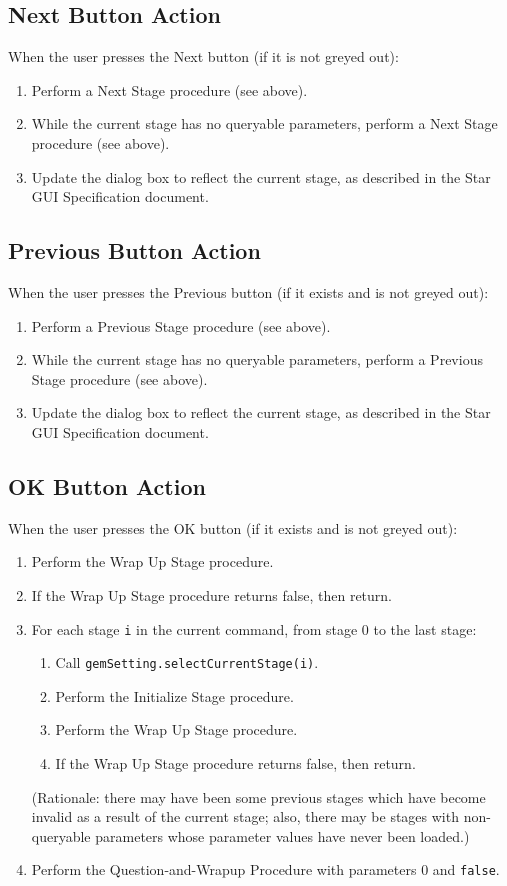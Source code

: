 \documentclass[11pt]{article}
\begin{document}
\subsection{Next Button Action}

When the user presses the Next button (if it is not greyed out):
\begin{enumerate}
\item Perform a Next Stage procedure (see above).
\item While the current stage has no queryable parameters, perform
  a Next Stage procedure (see above).
\item Update the dialog box to reflect the current stage, as described
  in the Star GUI Specification document.
\end{enumerate}

\subsection{Previous Button Action}

When the user presses the Previous button (if it exists and is not greyed
out):
\begin{enumerate}
\item Perform a Previous Stage procedure (see above).
\item While the current stage has no queryable parameters, perform
  a Previous Stage procedure (see above).
\item Update the dialog box to reflect the current stage, as described
  in the Star GUI Specification document.
\end{enumerate}

\subsection{OK Button Action}

When the user presses the OK button (if it exists and is not greyed
out):
\begin{enumerate}
\item Perform the Wrap Up Stage procedure.
\item If the Wrap Up Stage procedure returns false, then return.
\item For each stage \verb/i/ in the current command, from stage 0 to the
  last stage:
  \begin{enumerate}
  \item Call {\tt gemSetting.selectCurrentStage(i)}.
  \item Perform the Initialize Stage procedure.
  \item Perform the Wrap Up Stage procedure.
  \item If the Wrap Up Stage procedure returns false, then return.
  \end{enumerate}
  (Rationale:  there may have been some previous stages which have
  become invalid as a result of the current stage; also, there may be
  stages with non-queryable parameters whose parameter values have never
  been loaded.)
\item Perform the Question-and-Wrapup Procedure with parameters
  0 and {\tt false}.
\end{enumerate}
\end{document}
